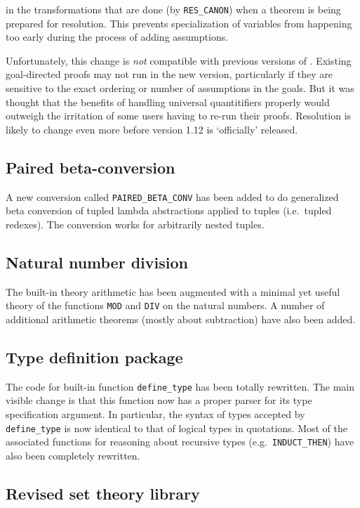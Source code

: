 \noindent in the transformations that are done (by {\tt RES\_CANON}) when a
theorem is being prepared for resolution.  This prevents specialization of
variables from happening too early during the process of adding assumptions.

Unfortunately, this change is {\it not} compatible with previous versions of
\HOL.  Existing goal-directed proofs may not run in the new version,
particularly if they are sensitive to the exact ordering or number of
assumptions in the goals.  But it was thought that the benefits of handling
universal quantitifiers properly would outweigh the irritation of some users
having to re-run their proofs.  Resolution is likely to change even more
before version 1.12 is `officially' released.

\subsection*{Paired beta-conversion}

A new conversion called {\tt PAIRED\_BETA\_CONV} has been added to do
generalized beta conversion of tupled lambda abstractions applied to tuples
(i.e.\ tupled redexes). The conversion works for arbitrarily nested tuples.

\subsection*{Natural number division}

The built-in theory arithmetic has been augmented with a minimal yet useful
theory of the functions {\tt MOD} and {\tt DIV} on the natural numbers.  A
number of additional arithmetic theorems (mostly about subtraction) have also
been added.

\subsection*{Type definition package}

The code for built-in function {\tt define\_type} has been totally rewritten.
The main visible change is that this function now has a proper parser for its
type specification argument.  In particular, the syntax of types accepted by
{\tt define\_type} is now identical to that of logical types in quotations.
Most of the associated functions for reasoning about recursive types (e.g.\ 
{\tt INDUCT\_THEN}) have also been completely rewritten.

\subsection*{Revised set theory library}

